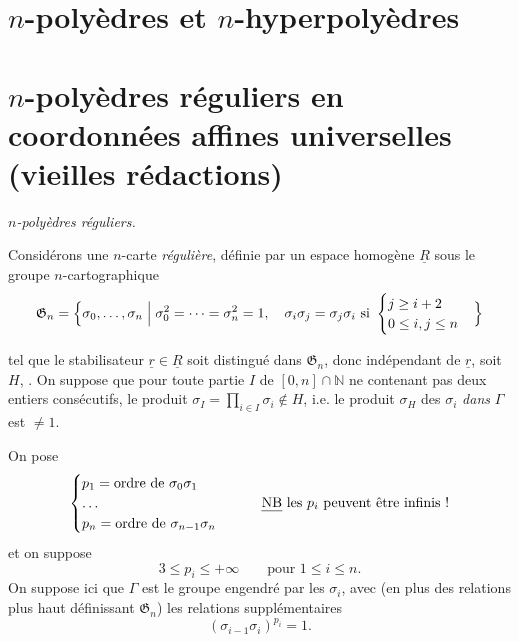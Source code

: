\documentclass[11pt,a4paper]{article}
\begin{document}
\section{$n$-polyèdres et $n$-hyperpolyèdres}

\section{$n$-polyèdres réguliers en coordonnées affines universelles (vieilles rédactions)}

\emph{$n$-polyèdres réguliers.}

Considérons \struck{\ill{}} une $n$-carte \emph{régulière}, définie par un espace homogène $\underline{R}$   sous le groupe $n$-cartographique
\[
\mathfrak{G}_n = \Bigl\{ \sigma_0,\dots,\sigma_n \Bigm| \sigma_0^2=\dots=\sigma_n^2=1,\quad \sigma_i\sigma_j=\sigma_j\sigma_i \ \text{si}\ \begin{cases} j\geq i+2 \\ 0\leq i,j\leq n \end{cases} \Bigr\}
\]

tel que le stabilisateur    $\underline{r}\in\underline{R}$ soit distingué dans $\mathfrak{G}_n$, donc indépendant de $\underline{r}$, soit $H$, . On suppose que pour toute partie $I$ de $[0,n]\cap\mathbb{N}$ ne contenant pas deux entiers consécutifs, le produit  $\sigma_I=\prod_{i\in I}\sigma_i\notin H$, i.e. le produit $\sigma_H$  des $\sigma_i$ \emph{dans} $\Gamma$ est $\neq 1$.

On pose
\[
\begin{cases}
p_1 = \text{ordre de } \sigma_0\sigma_1 \\
\dots \\
p_n = \text{ordre de } \sigma_{n-1}\sigma_n
\end{cases}
\qquad \text{\emph{NB} les $p_i$ peuvent être infinis !}
\]
et on suppose
\[
3\leq p_i\leq +\infty \qquad \text{pour } 1\leq i\leq n .
\]
On suppose ici que $\Gamma$ est le groupe engendré par les $\sigma_i$, avec (en plus des relations plus haut définissant $\mathfrak{G}_n$) les relations supplémentaires
\[
(\sigma_{i-1}\sigma_i)^{p_i}=1 .
\]
\end{document}
